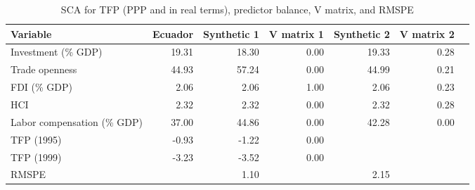 \begin{table}[!h]
\begin{center}
\caption{SCA for TFP (PPP and in real terms), predictor balance, V matrix, and RMSPE} \label{table:TFP_balance}
\begin{tabular}{l r r r r r r}     \\ \toprule
  Variable                    &    Ecuador &  Synthetic 1 & V matrix 1 & Synthetic 2 & V matrix 2 \\ \midrule 
  Investment (\% GDP)         &     19.31  &       18.30  &       0.00 &      19.33  &       0.28 \\
  Trade openness              &     44.93  &       57.24  &       0.00 &      44.99  &       0.21 \\ 
  FDI (\% GDP)                &      2.06  &        2.06  &      ~1.00 &       2.06  &       0.23 \\
  HCI                         &      2.32  &        2.32  &       0.00 &       2.32  &       0.28 \\
  Labor compensation (\% GDP) &     37.00  &       44.86  &      ~0.00 &      42.28  &       0.00 \\ \midrule
  TFP (1995)                  &     -0.93  &       -1.22  &      ~0.00 &             &            \\
  TFP (1999)                  &     -3.23  &       -3.52  &       0.00 &             &            \\ \midrule
  RMSPE                       &            &        1.10  &            &       2.15  &            \\
  \bottomrule 
\end{tabular}
\end{center}
\end{table}